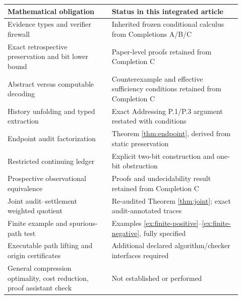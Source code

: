 \documentclass[11pt,letterpaper]{article}
\theoremstyle{definition}
\begin{document}
\begin{center}\small
\begin{tabular}{@{}p{0.41\linewidth}p{0.51\linewidth}@{}}\toprule
\textbf{Mathematical obligation}&\textbf{Status in this integrated article}\\\midrule
Evidence types and verifier firewall&Inherited frozen conditional calculus from Completions A/B/C\\
Exact retrospective preservation and bit lower bound&Paper-level proofs retained from Completion C\\
Abstract versus computable decoding&Counterexample and effective sufficiency conditions retained from Completion C\\
History unfolding and typed extraction&Exact Addressing P.1/P.3 argument restated with conditions\\
Endpoint audit factorization&Theorem \ref{thm:endpoint}, derived from static preservation\\
Restricted continuing ledger&Explicit two-bit construction and one-bit obstruction\\
Prospective observational equivalence&Proofs and undecidability result retained from Completion C\\
Joint audit--settlement weighted quotient&Re-audited Theorem \ref{thm:joint}; exact audit-annotated traces\\
Finite example and spurious-path test&Examples \ref{ex:finite-positive}--\ref{ex:finite-negative}, fully specified\\
Executable path lifting and origin certificates&Additional declared algorithm/checker interfaces required\\
General compression optimality, cost reduction, proof assistant check&Not established or performed\\\bottomrule
\end{tabular}
\end{center}
\clearpage
\end{document}
